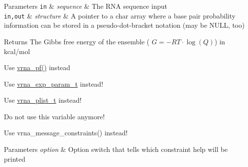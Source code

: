 \begin{DoxyRefList}
\begin{DoxyParams}[1]{Parameters}
\mbox{\tt in}  & {\em sequence} & The R\-N\-A sequence input \\
\hline
\mbox{\tt in,out}  & {\em structure} & A pointer to a char array where a base pair probability information can be stored in a pseudo-\/dot-\/bracket notation (may be N\-U\-L\-L, too) \\
\hline
\end{DoxyParams}
\begin{DoxyReturn}{Returns}
The Gibbs free energy of the ensemble ( $G = -RT \cdot \log(Q) $) in kcal/mol  
\end{DoxyReturn}

\item[\label{deprecated__deprecated000094}%
\hypertarget{deprecated__deprecated000094}{}%
Global \hyperlink{group__pf__fold_gac4f95bee734b2563a3d6e9932117ebdf}{pf\-\_\-fold\-\_\-par} (const char $\ast$sequence, char $\ast$structure, vrna\-\_\-exp\-\_\-param\-\_\-t $\ast$parameters, int calculate\-\_\-bppm, int is\-\_\-constrained, int is\-\_\-circular)]Use \hyperlink{group__pf__fold_ga29e256d688ad221b78d37f427e0e99bc}{vrna\-\_\-pf()} instead 
\item[\label{deprecated__deprecated000084}%
\hypertarget{deprecated__deprecated000084}{}%
Global \hyperlink{group__energy__parameters_ga8bffe1828e2cbec101769f5cc0b1535b}{pf\-\_\-param\-T} ]Use \hyperlink{group__energy__parameters_ga01d8b92fe734df8d79a6169482c7d8d8}{vrna\-\_\-exp\-\_\-param\-\_\-t} instead!  
\item[\label{deprecated__deprecated000043}%
\hypertarget{deprecated__deprecated000043}{}%
Global \hyperlink{group__data__structures_gab1d8894b43aa84cbc50b862a73785fbc}{plist} ]Use \hyperlink{group__data__structures_ga8e4eb5e1bfc95776559575beb359af87}{vrna\-\_\-plist\-\_\-t} instead!  
\item[\label{deprecated__deprecated000077}%
\hypertarget{deprecated__deprecated000077}{}%
Global \hyperlink{fold__vars_8h_ac98ec419070aee6831b44e5c700f090f}{pr} ]Do not use this variable anymore!  
\item[\label{deprecated__deprecated000039}%
\hypertarget{deprecated__deprecated000039}{}%
Global \hyperlink{constraints_8h_a4d167deb70bb51723e44374dc981deb2}{print\-\_\-tty\-\_\-constraint} (unsigned int option)]Use vrna\-\_\-message\-\_\-constraints() instead! 
\begin{DoxyParams}{Parameters}
{\em option} & Option switch that tells which constraint help will be printed  \\
\hline
\end{DoxyParams}


\end{DoxyRefList}
